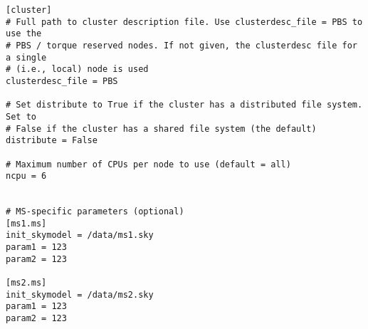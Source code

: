 \documentclass[structabstract]{article}
\begin{document}
\begin{verbatim}
[cluster]
# Full path to cluster description file. Use clusterdesc_file = PBS to use the
# PBS / torque reserved nodes. If not given, the clusterdesc file for a single
# (i.e., local) node is used
clusterdesc_file = PBS

# Set distribute to True if the cluster has a distributed file system. Set to
# False if the cluster has a shared file system (the default)
distribute = False

# Maximum number of CPUs per node to use (default = all)
ncpu = 6


# MS-specific parameters (optional)
[ms1.ms]
init_skymodel = /data/ms1.sky
param1 = 123
param2 = 123

[ms2.ms]
init_skymodel = /data/ms2.sky
param1 = 123
param2 = 123
\end{verbatim}

\end{document}
